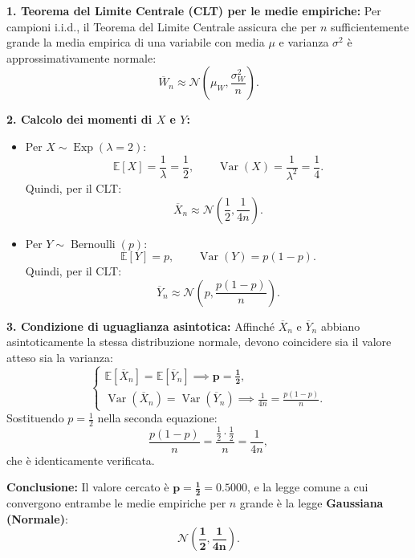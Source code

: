 \documentclass[11pt,a4paper]{article}
\newcommand{\EE}{\mathbb{E}}
\newcommand{\Var}{\operatorname{Var}}
\begin{document}
\begin{soluzionebox}
\textbf{1. Teorema del Limite Centrale (CLT) per le medie empiriche:}
Per campioni i.i.d., il Teorema del Limite Centrale assicura che per $n$ sufficientemente grande la media empirica di una variabile con media $\mu$ e varianza $\sigma^2$ è approssimativamente normale:
\[
\overline{W}_n \approx \mathcal{N}\left(\mu_W, \frac{\sigma_W^2}{n}\right).
\]

\textbf{2. Calcolo dei momenti di $X$ e $Y$:}
\begin{itemize}
    \item Per $X \sim \operatorname{Exp}(\lambda = 2)$:
    \[
    \EE[X] = \frac{1}{\lambda} = \frac{1}{2}, \qquad \Var(X) = \frac{1}{\lambda^2} = \frac{1}{4}.
    \]
    Quindi, per il CLT:
    \[
    \overline{X}_n \approx \mathcal{N}\left(\frac{1}{2}, \frac{1}{4n}\right).
    \]
    \item Per $Y \sim \operatorname{Bernoulli}(p)$:
    \[
    \EE[Y] = p, \qquad \Var(Y) = p(1-p).
    \]
    Quindi, per il CLT:
    \[
    \overline{Y}_n \approx \mathcal{N}\left(p, \frac{p(1-p)}{n}\right).
    \]
\end{itemize}

\textbf{3. Condizione di uguaglianza asintotica:}
Affinché $\overline{X}_n$ e $\overline{Y}_n$ abbiano asintoticamente la stessa distribuzione normale, devono coincidere sia il valore atteso sia la varianza:
\[
\begin{cases}
\EE[\overline{X}_n] = \EE[\overline{Y}_n] \implies \bm{p = \frac{1}{2}}, \\
\Var(\overline{X}_n) = \Var(\overline{Y}_n) \implies \frac{1}{4n} = \frac{p(1-p)}{n}.
\end{cases}
\]
Sostituendo $p = \frac{1}{2}$ nella seconda equazione:
\[
\frac{p(1-p)}{n} = \frac{\frac{1}{2} \cdot \frac{1}{2}}{n} = \frac{1}{4n},
\]
che è identicamente verificata.

\textbf{Conclusione:}
Il valore cercato è $\bm{p = \frac{1}{2} = 0.5000}$, e la legge comune a cui convergono entrambe le medie empiriche per $n$ grande è la legge \textbf{Gaussiana (Normale)}:
\[
\bm{\mathcal{N}\left(\frac{1}{2}, \frac{1}{4n}\right)}.
\]
\end{soluzionebox}
\end{document}
